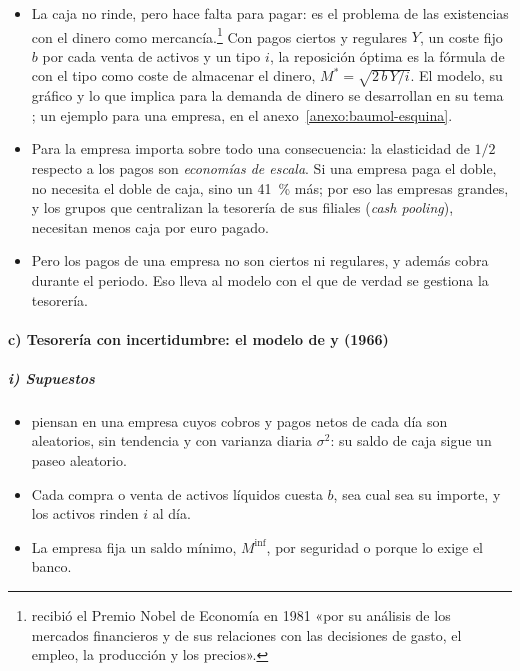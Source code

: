 \documentclass[11pt]{article}
\begin{document}
\begin{itemize}
\item La caja no rinde, pero hace falta para pagar: es el problema de las existencias con el dinero como mercancía\nocite{Baumol1952Transactions,Tobin1956Interest}.\footnote{ recibió el Premio Nobel de Economía en 1981 «por su análisis de los mercados financieros y de sus relaciones con las decisiones de gasto, el empleo, la producción y los precios»\nocite{Nobel1981Tobin}.} Con pagos ciertos y regulares $Y$, un coste fijo $b$ por cada venta de activos y un tipo $i$, la reposición óptima es la fórmula de  con el tipo como coste de almacenar el dinero, $M^{*}=\sqrt{2\,b\,Y/i}$. El modelo, su gráfico y lo que implica para la demanda de dinero se desarrollan en su tema ; un ejemplo para una empresa, en el anexo~\ref{anexo:baumol-esquina}.
\item Para la empresa importa sobre todo una consecuencia: la elasticidad de $1/2$ respecto a los pagos son \emph{economías de escala}. Si una empresa paga el doble, no necesita el doble de caja, sino un 41~\% más; por eso las empresas grandes, y los grupos que centralizan la tesorería de sus filiales (\emph{cash pooling}), necesitan menos caja por euro pagado.
\item Pero los pagos de una empresa no son ciertos ni regulares, y además cobra durante el periodo. Eso lleva al modelo con el que de verdad se gestiona la tesorería.
\end{itemize}

\paragraph{c) Tesorería con incertidumbre: el modelo de  y  (1966)}

\subparagraph{i) Supuestos}

\begin{itemize}
\item \textcite{MillerOrr1966Model} piensan en una empresa cuyos cobros y pagos netos de cada día son aleatorios, sin tendencia y con varianza diaria $\sigma^2$: su saldo de caja sigue un paseo aleatorio.
\item Cada compra o venta de activos líquidos cuesta $b$, sea cual sea su importe, y los activos rinden $i$ al día.
\item La empresa fija un saldo mínimo, $M^{\mathrm{inf}}$, por seguridad o porque lo exige el banco.
\end{itemize}
\end{document}
